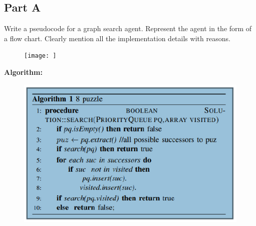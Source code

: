 \documentclass[conference]{IEEEtran}
\begin{document}
\subsection{Part A}
Write a pseudocode for a graph search agent. Represent
the agent in the form of a flow chart. Clearly mention all the
implementation details with reasons.
\begin{figure}[htbp]
\centerline{\texttt{[image: ]}}
\caption{}
\label{fig}
\end{figure}
\newline
\textbf{Algorithm:}
\begin{figure}[htbp]
\centerline{\includegraphics[scale=0.7]{alg.png}}
\end{figure}
\end{document}
